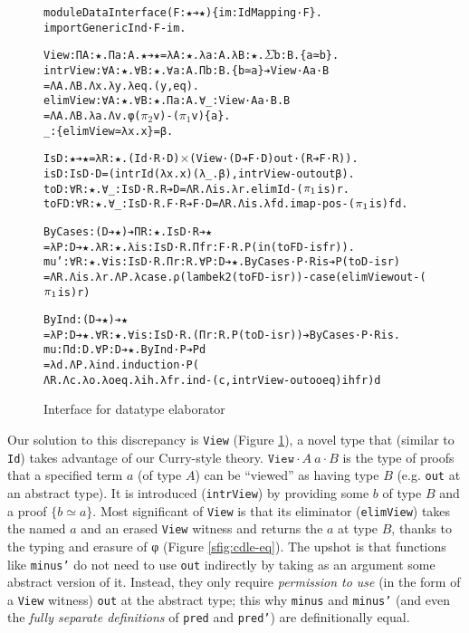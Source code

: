 \documentclass{article}
\begin{document}
\begin{figure}[h]
{
\begin{alltt}
module DataInterface (F: ★ ➔ ★) \{im: IdMapping · F\}.
import GenericInd ·F -im.

View: Π A: ★. Π a: A. ★ ➔ ★ = λ A: ★. λ a: A. λ B: ★. \(\Sigma\) b: B. \{a ≃ b\}.
intrView: ∀ A: ★. ∀ B: ★. ∀ a: A. Π b: B. \{b ≃ a\} ➔ View ·A a ·B
  = Λ A. Λ B. Λ x. λ y. λ eq. (y , eq).
elimView: ∀ A: ★. ∀ B: ★. Π a: A. ∀ _: View ·A a ·B. B
  = Λ A. Λ B. λ a. Λ v. φ (\(\pi_2\) v) - (\(\pi_1\) v) \{a\}.
_ : \{elimView ≃ λ x. x\} = β.

IsD: ★ ➔ ★ = λ R: ★. (Id ·R ·D) \(\times\) (View ·(D ➔ F ·D) out ·(R ➔ F ·R)).
isD: IsD ·D = (intrId (λ x. x) (λ _. β) , intrView -out out β).
toD: ∀ R: ★. ∀ _: IsD ·R. R ➔ D = Λ R. Λ is. λ r. elimId -(\(\pi\sb{1}\) is) r.
toFD: ∀ R: ★. ∀ _: IsD ·R. F ·R ➔ F ·D = Λ R. Λ is. λ fd. imap -pos -(\(\pi\sb{1}\) is) fd.

ByCases: (D ➔ ★) ➔ Π R: ★. IsD ·R ➔ ★
  = λ P: D ➔ ★. λ R: ★. λ is: IsD ·R. Π fr: F ·R. P (in (toFD -is fr)).
mu': ∀ R: ★. ∀ is: IsD ·R. Π r: R. ∀ P: D ➔ ★. ByCases ·P ·R is ➔ P (toD -is r)
  = Λ R. Λ is. λ r. Λ P. λ case. ρ (lambek2 (toFD -is r)) - case (elimView out -(\(\pi\sb{1}\) is) r)

ByInd: (D ➔ ★) ➔ ★
  = λ P: D ➔ ★. ∀ R: ★. ∀ is: IsD ·R. (Π r: R. P (toD -is r)) ➔ ByCases ·P ·R is.
mu: Π d: D. ∀ P: D ➔ ★. ByInd · P ➔ P d
  = λ d. Λ P. λ ind. induction ·P (
    Λ R. Λ c. λ o. λ oeq. λ ih. λ fr. ind -(c , intrView -out o oeq) ih fr) d
\end{alltt}
  }
  \caption{Interface for datatype elaborator}
  \label{fig:elab-interface}
\end{figure}

Our solution to this discrepancy is \texttt{View} (Figure \ref{fig:elab-interface}),
a novel type that (similar to \texttt{Id}) takes advantage of our Curry-style
theory. \(\texttt{View} ·A\ a ·B\) is the type of proofs that a specified term
$a$ (of type $A$) can be ``viewed'' as having type $B$ (e.g. \texttt{out} at
an abstract type). It is introduced (\texttt{intrView}) by providing some $b$
of type $B$ and a proof \(\{b ≃ a\}\). Most significant of \texttt{View} is that
its eliminator (\texttt{elimView}) takes the named $a$ and an erased
\texttt{View} witness and returns the $a$ at type $B$, thanks to the typing and
erasure of φ (Figure \ref{sfig:cdle-eq}). The upshot is that functions like
\texttt{minus'} do not need to use \texttt{out} indirectly by taking as an argument
some abstract version of it. Instead, they only
require \textit{permission to use} (in the form of a \texttt{View} witness)
\texttt{out} at the abstract type; this why \texttt{minus} and \texttt{minus'}
(and even the \textit{fully separate definitions} of \texttt{pred} and \texttt{pred'}) are
definitionally equal.
\end{document}
